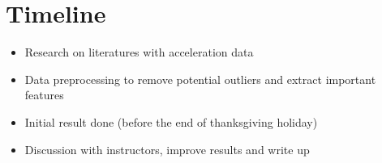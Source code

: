 \documentclass{article}
\begin{document}
	\section{Timeline} %
	\label{sec:timeline}
	\begin{itemize}
		\item Research on literatures with acceleration data
		\item Data preprocessing to remove potential outliers and extract important features 
		\item Initial result done (before the end of thanksgiving holiday)
		\item Discussion with instructors, improve results and write up
	\end{itemize}
	
	
\end{document}
